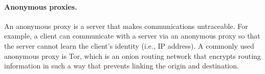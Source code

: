 \paragraph{Anonymous proxies.}
An anonymous proxy is a server that makes communications untraceable. For
example, a client can communicate with a server via an anonymous proxy so that
the server cannot learn the client's identity (i.e., IP address). A commonly
used anonymous proxy is Tor, which is an onion routing network that encrypts
routing information in such a way that prevents linking the origin and
destination.
